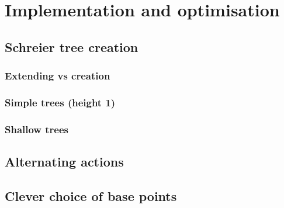 \chapter{Implementation and optimisation}

\section{Schreier tree creation}

\subsection{Extending vs creation}

\subsection{Simple trees (height 1)}

\subsection{Shallow trees}

\section{Alternating actions}

\section{Clever choice of base points}

